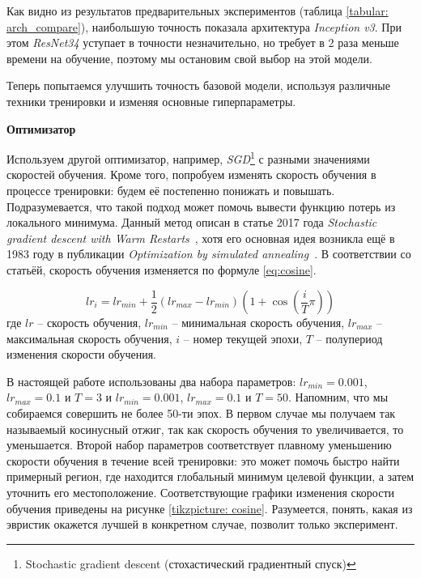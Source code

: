 \indent
\indent
Как видно из результатов предварительных экспериментов
(таблица \ref{tabular: arch_compare}), наибольшую
точность показала архитектура \textit{Inception v3}. При этом 
\textit{ResNet34} уступает в точности незначительно, но требует
в 2 раза меньше времени на обучение, поэтому мы остановим свой
выбор на этой модели. 


Теперь попытаемся улучшить точность базовой модели,
используя различные техники тренировки и изменяя основные гиперпараметры.

\indent
\indent
\textbf{Оптимизатор}

\indent
Используем другой оптимизатор, например,
\textit{SGD}\footnote{Stochastic gradient descent (стохастический 
градиентный спуск)} с 
разными значениями скоростей обучения.
Кроме того, попробуем изменять скорость обучения в процессе тренировки:
будем её постепенно понижать и повышать.
Подразумевается, что такой подход может
помочь вывести функцию потерь из локального минимума. Данный
метод описан в статье 2017 года
\textit{Stochastic gradient descent with Warm Restarts}~\cite{cosine},
хотя его основная идея возникла ещё в 1983 году в публикации
\textit{Optimization by simulated annealing}~\cite{annealing}. В соответствии со
статьёй, скорость обучения изменяется по формуле \ref{eq:cosine}.

\begin{equation}\label{eq:cosine}
    lr_i = lr_{min} + \frac{1}{2} (lr_{max} - lr_{min}) (1 + \cos(\frac{i}{T} \pi ))
\end{equation}
где $lr$ -- скорость обучения,
$lr_{min}$ -- минимальная скорость обучения,
$lr_{max}$ -- максимальная скорость обучения,
$i$ -- номер текущей эпохи,
$T$ -- полупериод изменения скорости обучения. 

\indent
В настоящей работе использованы два набора параметров:
$lr_{min} = 0.001$, $lr_{max} = 0.1$ и $T = 3$ и
$lr_{min} = 0.001$, $lr_{max} = 0.1$ и $T = 50$. 
Напомним, что мы собираемся совершить не более 50-ти эпох.
В первом случае мы получаем так называемый косинусный отжиг,
так как скорость обучения то увеличивается, то уменьшается.
Второй набор параметров соответствует плавному
уменьшению скорости обучения в течение всей тренировки:
это может помочь быстро найти примерный регион,
где находится глобальный
минимум целевой функции, а затем уточнить его местоположение.
Соответствующие графики изменения
скорости обучения приведены на рисунке \ref{tikzpicture: cosine}.
Разумеется, понять,
какая из эвристик окажется лучшей в конкретном случае, позволит
только эксперимент.


